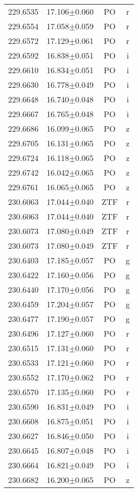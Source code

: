 \begin{table}
\begin{tabular}{cccc}
229.6535 & 17.106$\pm$0.060 & PO & r \\
229.6554 & 17.058$\pm$0.059 & PO & r \\
229.6572 & 17.129$\pm$0.061 & PO & r \\
229.6592 & 16.838$\pm$0.051 & PO & i \\
229.6610 & 16.834$\pm$0.051 & PO & i \\
229.6630 & 16.778$\pm$0.049 & PO & i \\
229.6648 & 16.740$\pm$0.048 & PO & i \\
229.6667 & 16.765$\pm$0.048 & PO & i \\
229.6686 & 16.099$\pm$0.065 & PO & z \\
229.6705 & 16.131$\pm$0.065 & PO & z \\
229.6724 & 16.118$\pm$0.065 & PO & z \\
229.6742 & 16.042$\pm$0.065 & PO & z \\
229.6761 & 16.065$\pm$0.065 & PO & z \\
230.6063 & 17.044$\pm$0.040 & ZTF & r \\
230.6063 & 17.044$\pm$0.040 & ZTF & r \\
230.6073 & 17.080$\pm$0.049 & ZTF & r \\
230.6073 & 17.080$\pm$0.049 & ZTF & r \\
230.6403 & 17.185$\pm$0.057 & PO & g \\
230.6422 & 17.160$\pm$0.056 & PO & g \\
230.6440 & 17.170$\pm$0.056 & PO & g \\
230.6459 & 17.204$\pm$0.057 & PO & g \\
230.6477 & 17.190$\pm$0.057 & PO & g \\
230.6496 & 17.127$\pm$0.060 & PO & r \\
230.6515 & 17.131$\pm$0.060 & PO & r \\
230.6533 & 17.121$\pm$0.060 & PO & r \\
230.6552 & 17.170$\pm$0.062 & PO & r \\
230.6570 & 17.135$\pm$0.060 & PO & r \\
230.6590 & 16.831$\pm$0.049 & PO & i \\
230.6608 & 16.875$\pm$0.051 & PO & i \\
230.6627 & 16.846$\pm$0.050 & PO & i \\
230.6645 & 16.807$\pm$0.048 & PO & i \\
230.6664 & 16.821$\pm$0.049 & PO & i \\
230.6682 & 16.200$\pm$0.065 & PO & z \\

\end{tabular}
\end{table}
